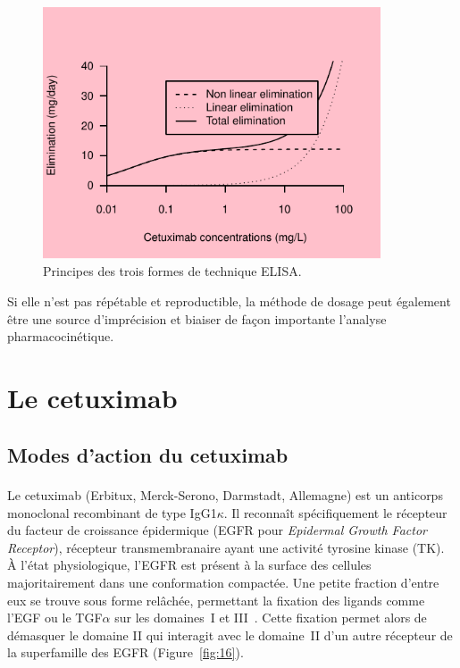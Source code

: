 \begin{figure}[htbp]
	\centering
		\includegraphics[width=10cm]{images/essai001.pdf}
	\caption{Principes des trois formes de technique ELISA.}
	\label{fig:15}
\end{figure}

Si elle n'est pas répétable et reproductible, la méthode de dosage peut également être une source d'imprécision et biaiser de façon importante l'analyse pharmacocinétique.

\section{Le cetuximab}

\subsection{Modes d'action du cetuximab}
Le cetuximab (Erbitux\textsuperscript{\textregistered}, Merck-Serono, Darmstadt, Allemagne) est un anticorps monoclonal recombinant de type IgG1$\kappa$. Il reconnaît spécifiquement le récepteur du facteur de croissance épidermique (EGFR pour \textit{Epidermal Growth Factor Receptor}), récepteur transmembranaire ayant une activité tyrosine kinase (TK). À l'état physiologique, l'EGFR est présent à la surface des cellules majoritairement dans une conformation compactée. Une petite fraction d'entre eux se trouve sous forme relâchée, permettant la fixation des ligands comme l'EGF ou le TGF$\alpha$ sur les domaines~I et III~\citep{REF97}. Cette fixation permet alors de démasquer le domaine II qui interagit avec le domaine~II d'un autre récepteur de la superfamille des EGFR (Figure~\ref{fig:16}).


